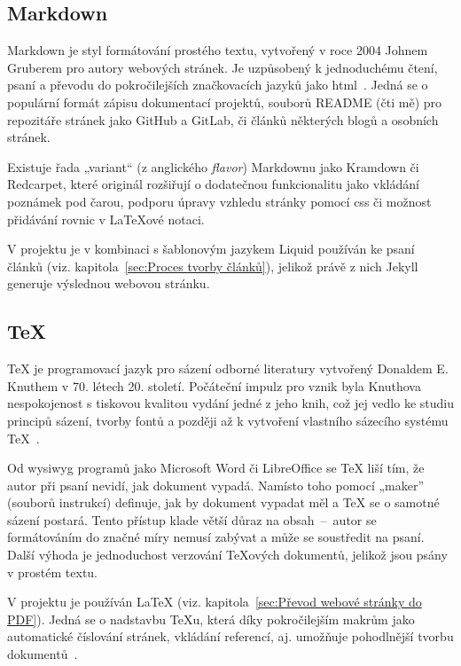 \documentclass[a4paper, 12pt, twoside]{article}
\begin{document}
  \subsection{Markdown} \label{sec:Markdown}
  Markdown je styl formátování prostého textu, vytvořený v roce 2004 Johnem Gruberem pro autory webových stránek. Je uzpůsobený k jednoduchému čtení, psaní a převodu do pokročilejších značkovacích jazyků jako \gls{html}~\cite{markdown-history}. Jedná se o populární formát zápisu dokumentací projektů, souborů README (čti mě) pro repozitáře stránek jako GitHub a GitLab, či článků některých blogů a osobních stránek.

  Existuje řada „variant“ (z anglického \textit{flavor}) Markdownu jako Kramdown či Redcarpet, které originál rozšiřují o dodatečnou funkcionalitu jako vkládání poznámek pod čarou, podporu úpravy vzhledu stránky pomocí \gls{css} či možnost přidávání rovnic v \LaTeX ové notaci.

  V projektu je v kombinaci s šablonovým jazykem Liquid používán ke psaní článků (viz. kapitola~\ref{sec:Proces tvorby článků}), jelikož právě z nich Jekyll generuje výslednou webovou stránku.


  \subsection{\TeX} \label{sec:TeX}
  \TeX{} je programovací jazyk pro sázení odborné literatury vytvořený Donaldem E. Knuthem v 70. létech 20. století. Počáteční impulz pro vznik byla Knuthova nespokojenost s tiskovou kvalitou vydání jedné z jeho knih, což jej vedlo ke studiu principů sázení, tvorby fontů a později až k vytvoření vlastního sázecího systému \TeX{}~\cite{tex-history}.

  Od \gls{wysiwyg} programů jako Microsoft Word či LibreOffice se \TeX{} liší tím, že autor při psaní nevidí, jak dokument vypadá. Namísto toho pomocí „maker” (souborů instrukcí) definuje, jak by dokument vypadat měl a \TeX{} se o samotné sázení postará. Tento přístup klade větší důraz na obsah~--~autor se formátováním do značné míry nemusí zabývat a může se soustředit na psaní. Další výhoda je jednoduchost verzování \TeX ových dokumentů, jelikož jsou psány v prostém textu.

  V projektu je používán \LaTeX{} (viz. kapitola~\ref{sec:Převod webové stránky do PDF}). Jedná se o nadstavbu \TeX u, která díky pokročilejším makrům jako automatické číslování stránek, vkládání referencí, aj. umožňuje pohodlnější tvorbu dokumentů~\cite{getting-started-with-latex}.
\end{document}
